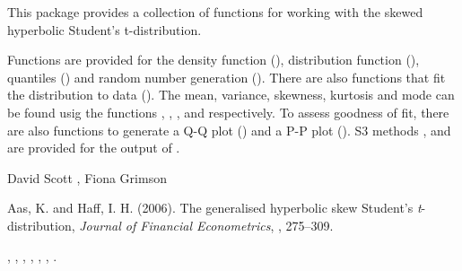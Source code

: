 \begin{Description}\relax
This package provides a collection of functions for working with the
skewed hyperbolic Student's t-distribution.

Functions are provided for the density function (),
distribution function (), quantiles () and
random number generation (). There are also functions
that fit the distribution to data (). The mean,
variance, skewness, kurtosis and mode can be found usig the functions
, , ,
 and  respectively. To assess
goodness of fit, there are also functions to generate a Q-Q plot
() and a P-P plot (). S3 methods
,  and  are provided for the output
of .

\end{Description}
\begin{Author}\relax
David Scott , Fiona Grimson
\end{Author}
\begin{References}\relax
Aas, K. and Haff, I. H. (2006).
The generalised hyperbolic skew Student's \emph{t}-distribution,
\emph{Journal of Financial Econometrics}, , 275--309.
\end{References}
\begin{SeeAlso}\relax
{}, ,
, ,
, ,
.
\end{SeeAlso}

